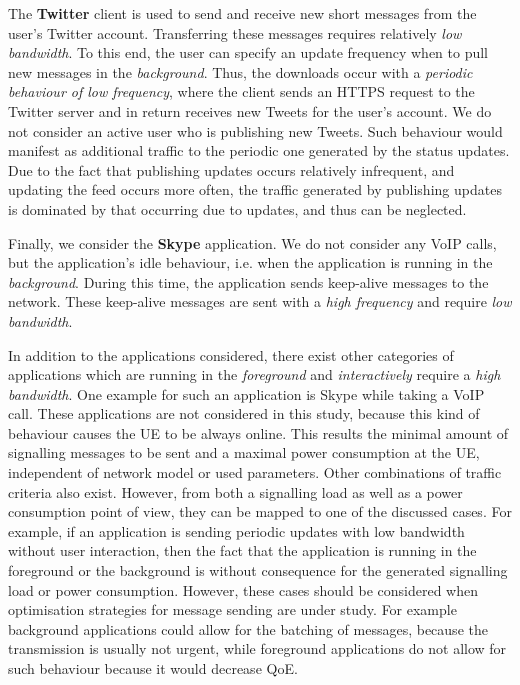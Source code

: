 The \textbf{Twitter} client is used to send and receive new short messages from the user's Twitter account.
Transferring these messages requires relatively \emph{low bandwidth}.
To this end, the user can specify an update frequency when to pull new messages in the \emph{background}.
Thus, the downloads occur with a \emph{periodic behaviour of low frequency}, where
the client sends an \gls{HTTPS} request to the Twitter server and in return receives new Tweets for the user's account.
We do not consider an active user who is publishing new Tweets.
Such behaviour would manifest as additional traffic to the periodic one generated by the status updates.
Due to the fact that publishing updates occurs relatively infrequent, and updating the feed occurs more often, the traffic generated by publishing updates is dominated by that occurring due to updates, and thus can be neglected.

Finally, we consider the \textbf{Skype} application.
We do not consider any \gls{VoIP} calls, but the application's idle behaviour, i.e. when the application is running in the \emph{background}.
During this time, the application sends keep-alive messages to the network.
These keep-alive messages are sent with a \emph{high frequency} and require \emph{low bandwidth}.

In addition to the applications considered, there exist other categories of applications which are running in the \emph{foreground} and \emph{interactively} require a \emph{high bandwidth}.
One example for such an application is Skype while taking a \gls{VoIP} call.
These applications are not considered in this study, because this kind of behaviour causes the \gls{UE} to be always online.
This results the minimal amount of signalling messages to be sent and a maximal power consumption at the \gls{UE}, independent of network model or used parameters.
Other combinations of traffic criteria also exist.
However, from both a signalling load as well as a power consumption point of view, they can be mapped to one of the discussed cases.
For example, if an application is sending periodic updates with low bandwidth without user interaction, then the fact that the application is running in the foreground or the background is without consequence for the generated signalling load or power consumption.
However, these cases should be considered when optimisation strategies for message sending are under study.
For example background applications could allow for the batching of messages, because the transmission is usually not urgent, while foreground applications do not allow for such behaviour because it would decrease \gls{QoE}.

